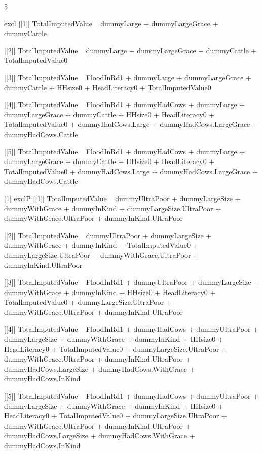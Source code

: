 \begin{Schunk}
\begin{Soutput}
[1] 5
\end{Soutput}
\end{Schunk}
\begin{Schunk}
\begin{Soutput}
[1] excl
[[1]]
TotalImputedValue ~ dummyLarge + dummyLargeGrace + dummyCattle

[[2]]
TotalImputedValue ~ dummyLarge + dummyLargeGrace + dummyCattle + 
    TotalImputedValue0

[[3]]
TotalImputedValue ~ FloodInRd1 + dummyLarge + dummyLargeGrace + 
    dummyCattle + HHsize0 + HeadLiteracy0 + TotalImputedValue0

[[4]]
TotalImputedValue ~ FloodInRd1 + dummyHadCows + dummyLarge + 
    dummyLargeGrace + dummyCattle + HHsize0 + HeadLiteracy0 + 
    TotalImputedValue0 + dummyHadCows.Large + dummyHadCows.LargeGrace + 
    dummyHadCows.Cattle

[[5]]
TotalImputedValue ~ FloodInRd1 + dummyHadCows + dummyLarge + 
    dummyLargeGrace + dummyCattle + HHsize0 + HeadLiteracy0 + 
    TotalImputedValue0 + dummyHadCows.Large + dummyHadCows.LargeGrace + 
    dummyHadCows.Cattle

[1] exclP
[[1]]
TotalImputedValue ~ dummyUltraPoor + dummyLargeSize + dummyWithGrace + 
    dummyInKind + dummyLargeSize.UltraPoor + dummyWithGrace.UltraPoor + 
    dummyInKind.UltraPoor

[[2]]
TotalImputedValue ~ dummyUltraPoor + dummyLargeSize + dummyWithGrace + 
    dummyInKind + TotalImputedValue0 + dummyLargeSize.UltraPoor + 
    dummyWithGrace.UltraPoor + dummyInKind.UltraPoor

[[3]]
TotalImputedValue ~ FloodInRd1 + dummyUltraPoor + dummyLargeSize + 
    dummyWithGrace + dummyInKind + HHsize0 + HeadLiteracy0 + 
    TotalImputedValue0 + dummyLargeSize.UltraPoor + dummyWithGrace.UltraPoor + 
    dummyInKind.UltraPoor

[[4]]
TotalImputedValue ~ FloodInRd1 + dummyHadCows + dummyUltraPoor + 
    dummyLargeSize + dummyWithGrace + dummyInKind + HHsize0 + 
    HeadLiteracy0 + TotalImputedValue0 + dummyLargeSize.UltraPoor + 
    dummyWithGrace.UltraPoor + dummyInKind.UltraPoor + dummyHadCows.LargeSize + 
    dummyHadCows.WithGrace + dummyHadCows.InKind

[[5]]
TotalImputedValue ~ FloodInRd1 + dummyHadCows + dummyUltraPoor + 
    dummyLargeSize + dummyWithGrace + dummyInKind + HHsize0 + 
    HeadLiteracy0 + TotalImputedValue0 + dummyLargeSize.UltraPoor + 
    dummyWithGrace.UltraPoor + dummyInKind.UltraPoor + dummyHadCows.LargeSize + 
    dummyHadCows.WithGrace + dummyHadCows.InKind


\end{Soutput}
\end{Schunk}
